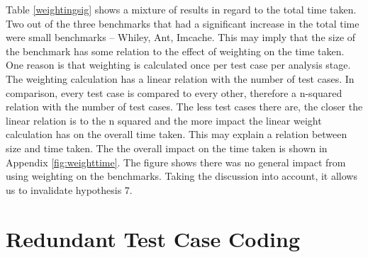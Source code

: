 \documentclass[11pt
              , a4paper
              , twoside
              , openright
              ]{report}
\begin{document}
Table \ref{weightingsig} shows a mixture of results in regard to the total time taken. Two out of the three benchmarks that had a significant increase in the total time were small benchmarks -- Whiley, Ant, Imcache. This may imply that the size of the benchmark has some relation to the effect of weighting on the time taken. One reason is that weighting is calculated once per test case per analysis stage. The weighting calculation has a linear relation with the number of test cases. In comparison, every test case is compared to every other, therefore a n-squared relation with the number of test cases. The less test cases there are, the closer the linear relation is to the n squared and the more impact the linear weight calculation has on the overall time taken. This may explain a relation between size and time taken. The the overall impact on the time taken is shown in Appendix \ref{fig:weighttime}. The figure shows there was no general impact from using weighting on the benchmarks. Taking the discussion into account, it allows us to invalidate hypothesis 7.

\section{Redundant Test Case Coding}

\end{document}
